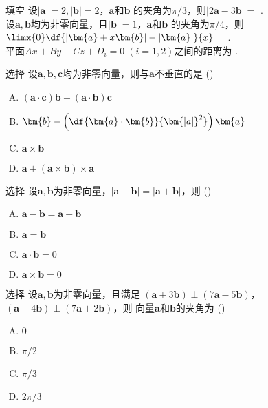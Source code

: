 \begin{frame}{填空}
	\linespread{1.2}
	\;设$|\bm{a}|=2,|\bm{b}|=2$，$\bm{a}$和$\bm{b}$
	的夹角为$\pi/3$，则$|2\bm{a}-3\bm{b}|=$
	\underline{\;}.\\[1em]
	
	\;设$\bm{a},\bm{b}$均为非零向量，且$|\bm{b}|=1$，$\bm{a}$和$\bm{b}$
	的夹角为$\pi/4$，则$\limx{0}\df{|\bm{a}+x\bm{b}|-|\bm{a}|}{x}=$
	\underline{\;}.\\[1em]
	
	\;平面$Ax+By+Cz+D_i=0\;(i=1,2)$之间的距离为
	\underline{\;}.
\end{frame}

\begin{frame}{选择}
	\linespread{1.3}
	\;设$\bm{a},\bm{b},\bm{c}$均为非零向量，则与$\bm{a}$不垂直的是
	(\underline{\;})
	\begin{enumerate}[(A)]
	  \item $(\bm{a}\cdot\bm{c})\bm{b}-(\bm{a}\cdot\bm{b})\bm{c}$
	  \item $\bm{b}-\left(\df{\bm{a}\cdot\bm{b}}{\bm{|a|}^2}\right)\bm{a}$
	  \item $\bm{a}\times\bm{b}$
	  \item $\bm{a}+(\bm{a}\times\bm{b})\times\bm{a}$
	\end{enumerate}
\end{frame}

\begin{frame}{选择}
	\linespread{1.3}
	\;设$\bm{a},\bm{b}$为非零向量，$|\bm{a}-\bm{b}|=|\bm{a}+\bm{b}|$，则
	(\underline{\;})
	\begin{enumerate}[(A)]
	  \item $\bm{a}-\bm{b}=\bm{a}+\bm{b}$
	  \item $\bm{a}=\bm{b}$
	  \item $\bm{a}\cdot\bm{b}=0$
	  \item $\bm{a}\times\bm{b}=0$
	\end{enumerate}
\end{frame}

\begin{frame}{选择}
	\linespread{1.3}
	\;设$\bm{a},\bm{b}$为非零向量，且满足
	$(\bm{a}+3\bm{b})\perp(7\bm{a}-5\bm{b})$，
	$(\bm{a}-4\bm{b})\perp(7\bm{a}+2\bm{b})$，则
	向量$\bm{a}$和$\bm{b}$的夹角为
	(\underline{\;})
	\begin{enumerate}[(A)]
	  \item $0$
	  \item $\pi/2$
	  \item $\pi/3$
	  \item $2\pi/3$
	\end{enumerate}
\end{frame}

